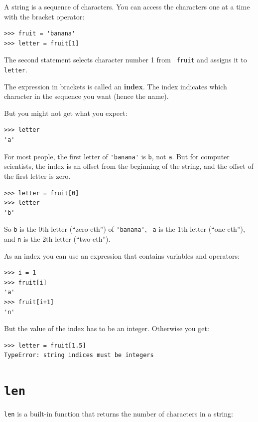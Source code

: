 \documentclass[10pt]{book}
\begin{document}
A string is a sequence of characters.  
You can access the characters one at a time with the
bracket operator:

\begin{verbatim}
>>> fruit = 'banana'
>>> letter = fruit[1]
\end{verbatim}
%
The second statement selects character number 1 from {\tt
fruit} and assigns it to {\tt letter}.  

The expression in brackets is called an {\bf index}.  
The index indicates which character in the sequence you
want (hence the name).

But you might not get what you expect:

\begin{verbatim}
>>> letter
'a'
\end{verbatim}
%
For most people, the first letter of \verb"'banana'" is {\tt b}, not
{\tt a}.  But for computer scientists, the index is an offset from the
beginning of the string, and the offset of the first letter is zero.

\begin{verbatim}
>>> letter = fruit[0]
>>> letter
'b'
\end{verbatim}
%
So {\tt b} is the 0th letter (``zero-eth'') of \verb"'banana'", {\tt
  a} is the 1th letter (``one-eth''), and {\tt n} is the 2th letter
(``two-eth'').   

As an index you can use an expression that contains variables and
operators:

\begin{verbatim}
>>> i = 1
>>> fruit[i]
'a'
>>> fruit[i+1]
'n'
\end{verbatim}
%

But the value of the index has to be an integer.  Otherwise you
get:

\begin{verbatim}
>>> letter = fruit[1.5]
TypeError: string indices must be integers
\end{verbatim}
%

\section{{\tt len}}

{\tt len} is a built-in function that returns the number of characters
in a string:
\end{document}
